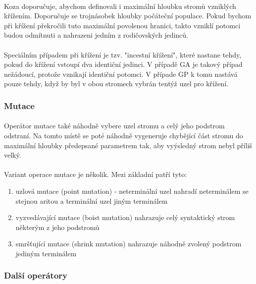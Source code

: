 \documentclass[bc,male,java,dept460]{diploma}		%
\begin{document}
\paragraph*{}
Koza doporučuje, abychom definovali i maximální hloubku stromů vzniklých křížením. Doporučuje se trojnásobek hloubky počáteční populace. Pokud bychom při křížení překročili tuto maximální povolenou hranici, takto vzniklí potomci budou odmítnuti a nahrazeni jedním z rodičovských jedinců.

\paragraph*{}
Speciálním případem při křížení je tzv. "incestní křížení", které nastane tehdy, pokud do křížení vstoupí dva identiční jedinci. V případě GA je takový případ nežádoucí, protože vznikají identiční potomci. V případe GP k tomu nastává pouze tehdy, když by byl v obou stromech vybrán tentýž uzel pro křížení.

\subsubsection{Mutace}
\paragraph*{}
Operátor mutace také náhodně vybere uzel stromu a celý jeho podstrom odstraní. Na tomto místě se poté náhodně vygeneruje chybějící část stromu do maximální hloubky předepsané parametrem tak, aby vyýsledný strom nebyl příliš velký. 
\paragraph*{}
Variant operace mutace je několik. Mezi základní patří tyto:
\begin{enumerate}
\item uzlová mutace (point mutation) - neterminální uzel nahradí neterminálem se stejnou aritou a terminální uzel jiným terminálem
\item vyzvedávající mutace (boist mutation) nahrazuje celý syntaktický strom některým z jeho podstromů
\item smršťující mutace (shrink mutation) nahrazuje náhodně zvolený podstrom jediným terminálem
\end{enumerate}

\subsubsection{Další operátory}
\end{document}
